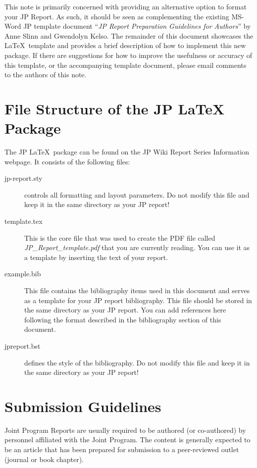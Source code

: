 \documentclass[12pt,fleqn]{article}
\begin{document}
This note is primarily concerned with providing an alternative option to format
your JP Report. As such, it should be seen as complementing the existing MS-Word
JP template document ``\emph{JP Report Preparation Guidelines for Authors}'' by
Anne Slinn and Gwendolyn Kelso. The remainder of this document showcases the
\LaTeX\, template and provides a brief description of how to implement this new
package. If there are suggestions for how to improve the usefulness or accuracy
of this template, or the accompanying template document, please email comments
to the authors of this note.

\section{File Structure of the JP \LaTeX\, Package}

The JP \LaTeX\, package can be found on the JP Wiki Report Series Information 
webpage. It consists of the following files: 
\begin{description}
  \item[\ttfamily jp-report.sty] controls all formatting and layout
  parameters. Do not modify this file and keep it in the same directory as your
  JP report!
  \item[\ttfamily template.tex] This is the core file
  that was used to create the PDF file called \textit{JP\_Report\_template.pdf}
  that you are currently reading. You can use it as a template by inserting the
  text of your report. 
  \item[\ttfamily example.bib] This file contains the bibliography
  items used in this document and serves as a template for your JP report
  bibliography. This file should be stored in the same directory as your JP
  report. You can add references here following the format described in the
  bibliography section of this document.
  \item[\ttfamily jpreport.bst] defines the style of the bibliography. Do not
  modify this file and keep it in the same directory as your JP report!
\end{description}

\section{Submission Guidelines}
Joint Program Reports are usually required to be authored (or co-authored) by
personnel affiliated with the Joint Program. The content is generally expected
to be an article that has been prepared for submission to a peer-reviewed outlet
(journal or book chapter).
\end{document}
